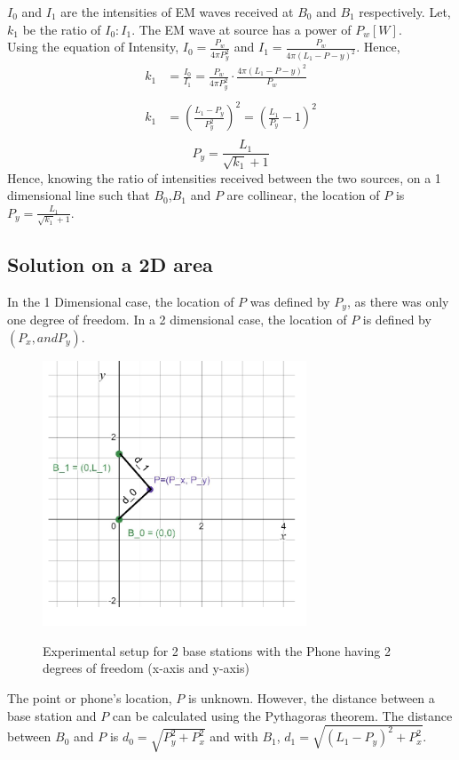 \documentclass[a4paper,12pt]{article}
\begin{document}
$I_0$ and $I_1$ are the intensities of EM waves received at $B_0$ and $B_1$ respectively. Let, $k_1$ be the ratio of $I_0:I_1$. The EM wave at source has a power of $P_w [W]$.
\\
Using the equation of Intensity, $I_0=\frac{P_w}{4\pi P_y^2}$ and $I_1=\frac{P_w}{4\pi (L_1-P-y)^2}$.
Hence, 
\begin{equation*}
    \begin{split}
    k_1 &= \frac{I_0}{I_1}=\frac{P_w}{4\pi P_y^2}\cdot\frac{4\pi (L_1-P-y)^2}{P_w}\\\\
    k_1 &= \left(\frac{L_1-P_y}{P_y^2}\right)^2=\left(\frac{L_1}{P_y}-1\right)^2\\
    \end{split}
\end{equation*}
\begin{equation}
    P_y = \frac{L_1}{\sqrt{k_1}+1}
\label{eq:1d_sol}
\end{equation}
Hence, knowing the ratio of intensities received between the two sources, on a 1 dimensional line such that $B_0$,$B_1$ and $P$ are collinear, the location of $P$ is $P_y=\frac{L_1}{\sqrt{k_1}+1}$.


\subsection{Solution on a 2D area}
In the 1 Dimensional case, the location of $P$ was defined by $P_y$, as there was only one degree of freedom. In a 2 dimensional case, the location of $P$ is defined by $(P_x, and P_y)$.

\begin{figure}[H]
    \caption{Experimental setup for 2 base stations with the Phone having 2 degrees of freedom (x-axis and y-axis)}
    \centering 
    \includegraphics[width=0.7\textwidth]{draw2.pdf}
~\label{fig:draw2}
\end{figure}
The point or phone's location, $P$ is unknown. However, the distance between a base station and $P$ can be calculated using the Pythagoras theorem. The distance between $B_0$ and $P$ is $d_0=\sqrt{P_y^2 + P_x^2}$
and with $B_1$, $d_1=\sqrt{(L_1-P_y)^2 + P_x^2}$.
\end{document}
